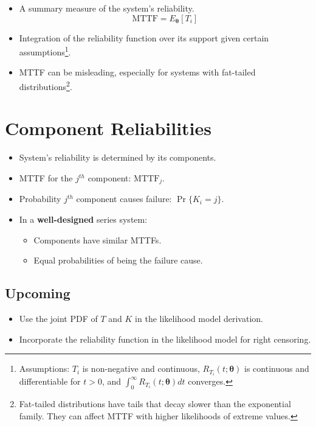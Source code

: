 \documentclass[]{tufte-book}
\providecommand{\tightlist}{%
  \setlength{\itemsep}{0pt}\setlength{\parskip}{0pt}}
\theoremstyle{definition}
\theoremstyle{plain}
\begin{document}
\begin{itemize}
\tightlist
\item
  A summary measure of the system's reliability.
  \[ \text{MTTF} = E_{\boldsymbol{\theta}}[T_i] \]
\item
  Integration of the reliability function over its support given certain assumptions\footnote{Assumptions: \(T_i\) is non-negative and continuous, \(R_{T_i}(t;\boldsymbol{\theta})\) is continuous and differentiable for \(t > 0\), and \(\int_0^\infty R_{T_i}(t;\boldsymbol{\theta}) dt\) converges.}.
\item
  MTTF can be misleading, especially for systems with fat-tailed distributions\footnote{Fat-tailed distributions have tails that decay slower than the exponential family. They can affect MTTF with higher likelihoods of extreme values.}.
\end{itemize}

\hypertarget{component-reliabilities}{%
\section{Component Reliabilities}\label{component-reliabilities}}

\begin{itemize}
\tightlist
\item
  System's reliability is determined by its components.
\item
  MTTF for the \(j^{th}\) component: \(\text{MTTF}_j\).
\item
  Probability \(j^{th}\) component causes failure: \(\Pr\{K_i = j\}\).
\item
  In a \textbf{well-designed} series system:

  \begin{itemize}
  \tightlist
  \item
    Components have similar MTTFs.
  \item
    Equal probabilities of being the failure cause.
  \end{itemize}
\end{itemize}

\hypertarget{upcoming}{%
\subsection{Upcoming}\label{upcoming}}

\begin{itemize}
\tightlist
\item
  Use the joint PDF of \(T\) and \(K\) in the likelihood model derivation.
\item
  Incorporate the reliability function in the likelihood model for right censoring.
\end{itemize}


\end{document}

